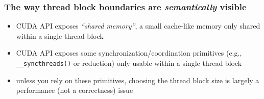 \documentclass[12pt,dvipdfmx]{beamer}
\newcommand{\ao}[1]{{\color{blue}#1}}
\begin{document}
\begin{frame}
  \frametitle{The way thread block boundaries are {\it semantically} visible}
  \begin{itemize}
  \item<2-> CUDA API exposes \ao{\it ``shared memory''}, a small cache-like
    memory only shared within a single thread block
  \item<3-> CUDA API exposes some synchronization/coordination primitives
    (e.g., {\tt \_\_syncthreads()} or reduction) only usable within
    a single thread block
  \item<4-> unless you rely on these primitives,
    choosing the thread block size is largely a performance
    (not a correctness) issue
  \end{itemize}
  \begin{center}
  \end{center}
\end{frame}
\end{document}
